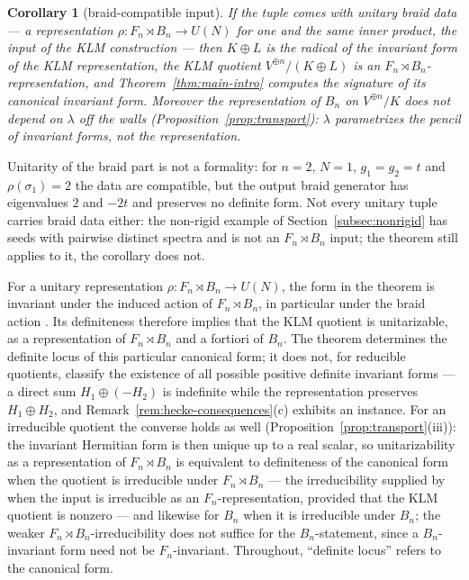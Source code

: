 \documentclass[11pt]{article}
\newtheorem{corollary}[theorem]{Corollary}
\theoremstyle{definition}
\begin{document}
\begin{corollary}[braid-compatible input]\label{cor:main-braid}
If the tuple comes with \emph{unitary} braid data --- a
representation $\rho\colon F_n\rtimes B_n\to U(N)$ for one and the
same inner product, the input of the KLM construction --- then $K\oplus L$
is the radical of the invariant form of the KLM representation, the
KLM quotient $V^{\oplus n}/(K\oplus L)$ is an
$F_n\rtimes B_n$-representation, and
Theorem~\ref{thm:main-intro} computes the signature of its canonical
invariant form. Moreover the representation of $B_n$ on
$V^{\oplus n}/K$ does not depend on $\lambda$ off the walls
(Proposition~\ref{prop:transport}): $\lambda$ parametrizes the pencil
of invariant forms, not the representation.
\end{corollary}

Unitarity of the braid part is not a formality: for $n=2$, $N=1$,
$g_1=g_2=t$ and $\rho(\sigma_1)=2$ the data are compatible, but the
output braid generator has eigenvalues $2$ and $-2t$ and preserves no
definite form. Not every unitary tuple carries braid data either: the
non-rigid example of
Section~\ref{subsec:nonrigid} has seeds with pairwise distinct spectra
and is not an $F_n\rtimes B_n$ input; the theorem still applies to it,
the corollary does not.

For a unitary representation $\rho\colon F_n\rtimes B_n\to U(N)$,
the form in the theorem is invariant under the induced action of
$F_n\rtimes B_n$, in particular under the braid action
\cite[Thm.~8]{N-KLM}. Its definiteness therefore implies that the
KLM quotient is unitarizable, as a representation of
$F_n\rtimes B_n$ and a fortiori of $B_n$. The theorem determines the
definite locus of this particular canonical form; it does not, for
reducible quotients, classify the existence of all possible positive
definite invariant forms --- a direct sum $H_1\oplus(-H_2)$ is
indefinite while the representation preserves $H_1\oplus H_2$, and
Remark~\ref{rem:hecke-consequences}(c) exhibits an instance. For an
irreducible quotient the converse holds as well
(Proposition~\ref{prop:transport}(iii)): the invariant Hermitian
form is then unique up to a real scalar, so unitarizability as a
representation of $F_n\rtimes B_n$ is equivalent to definiteness of
the canonical form when the quotient is irreducible under
$F_n\rtimes B_n$ --- the irreducibility supplied by
\cite[\S4.3]{N-KLM} when the input is irreducible as an
$F_n$-representation, provided that the KLM quotient is nonzero ---
and likewise for $B_n$ when it is
irreducible under $B_n$; the weaker $F_n\rtimes B_n$-irreducibility
does not suffice for the $B_n$-statement, since a $B_n$-invariant
form need not be $F_n$-invariant. Throughout, ``definite locus''
refers to the canonical form.
\end{document}
